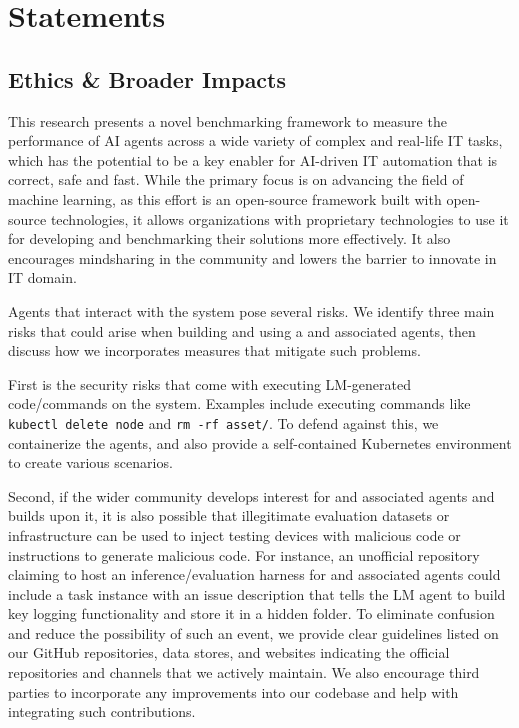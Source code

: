 \section{Statements}
\subsection{Ethics \& Broader Impacts}
\label{appx:statement:impacts}
This research presents a novel benchmarking framework to measure the performance of AI agents across a wide variety of complex and real-life IT tasks, which has the potential to be a key enabler for AI-driven IT automation that is correct, safe and fast. While the primary focus is on advancing the field of machine learning, as this effort is an open-source framework built with open-source technologies, it allows organizations with proprietary technologies to use it
for developing and benchmarking their solutions more effectively. 
It also encourages mindsharing in the community and lowers the barrier to innovate in IT domain.

Agents that interact with the system pose several risks.
We identify three main risks that could arise when building and using a \bench and associated agents, then discuss how we incorporates measures that mitigate such problems.

First is the security risks that come with executing LM-generated code/commands on the system. Examples include executing commands like \texttt{kubectl delete node} and  \texttt{rm -rf asset/}.
To defend against this, we containerize the agents, and also provide a self-contained Kubernetes environment to create various scenarios.  

Second, if the wider community develops interest for \bench and associated agents and builds upon it, it is also possible that illegitimate evaluation datasets or infrastructure can be used to inject testing devices with malicious code or instructions to generate malicious code.
For instance, an unofficial repository claiming to host an inference/evaluation harness for \bench and associated agents could include a task instance with an issue description that tells the LM agent to build key logging functionality and store it in a hidden folder.
To eliminate confusion and reduce the possibility of such an event, we provide clear guidelines listed on our GitHub repositories, data stores, and websites indicating the official repositories and channels that we actively maintain.
We also encourage third parties to incorporate any improvements into our codebase and help with integrating such contributions.

